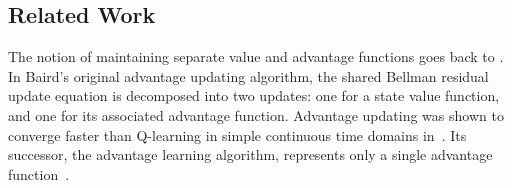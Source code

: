
%  



\subsection{Related Work}

The notion of maintaining separate value and advantage functions goes back to \citet{Baird:1993}. In Baird's original advantage updating algorithm, the shared Bellman residual update equation is decomposed into two updates: one for a state value function, and one for its associated advantage function. Advantage updating was shown to converge faster than Q-learning in simple continuous time domains in~\cite{Harmon:1995}. Its successor, the advantage learning algorithm, represents only a single advantage function~\cite{Harmon:1996}.





